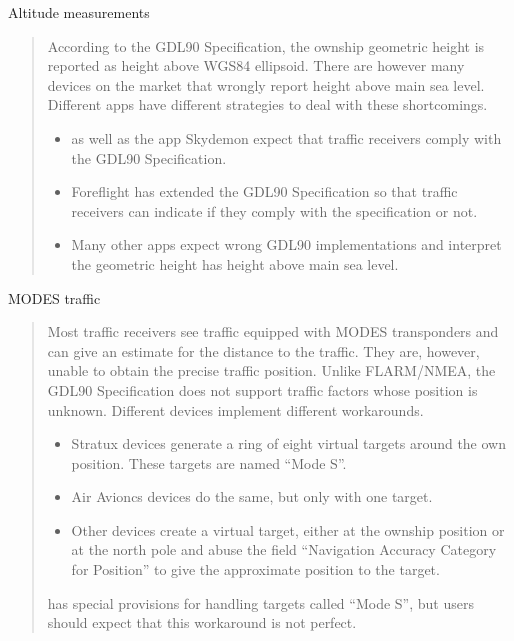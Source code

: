 \documentclass[letterpaper,10pt,english]{sphinxmanual}
\begin{document}
\sphinxAtStartPar
Altitude measurements
\begin{quote}

\sphinxAtStartPar
According to the GDL90 Specification, the ownship geometric height is reported
as height above WGS\sphinxhyphen{}84 ellipsoid.  There are however many devices on the
market that wrongly report height above main sea level.  Different apps have
different strategies to deal with these shortcomings.
\begin{itemize}
\item {} 
\sphinxAtStartPar
{} as well as the app Skydemon expect that
traffic receivers comply with the GDL90 Specification.

\item {} 
\sphinxAtStartPar
Foreflight has extended the GDL90 Specification so that traffic receivers
can indicate if they comply with the specification or not.

\item {} 
\sphinxAtStartPar
Many other apps expect wrong GDL90 implementations and interpret the
geometric height has height above main sea level.

\end{itemize}
\end{quote}

\sphinxAtStartPar
MODE\sphinxhyphen{}S traffic
\begin{quote}

\sphinxAtStartPar
Most traffic receivers see traffic equipped with MODE\sphinxhyphen{}S transponders and can
give an estimate for the distance to the traffic.  They are, however, unable
to obtain the precise traffic position.  Unlike FLARM/NMEA, the GDL90
Specification does not support traffic factors whose position is unknown.
Different devices implement different workarounds.
\begin{itemize}
\item {} 
\sphinxAtStartPar
Stratux devices generate a ring of eight virtual targets around the own
position.  These targets are named “Mode S”.

\item {} 
\sphinxAtStartPar
Air Avioncs devices do the same, but only with one target.

\item {} 
\sphinxAtStartPar
Other devices create a virtual target, either at the ownship position or at
the north pole and abuse the field “Navigation Accuracy Category for
Position” to give the approximate position to the target.

\end{itemize}

\sphinxAtStartPar
{} has special provisions for handling targets
called “Mode S”, but users should expect that this workaround is not perfect.
\end{quote}
\end{document}
